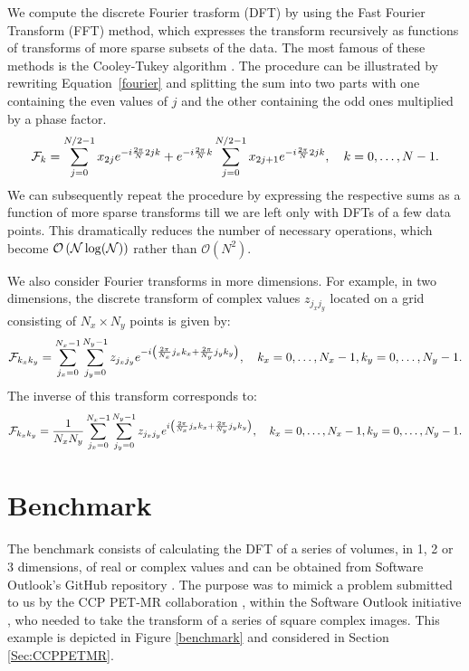 \documentclass[12pt, a4paper]{article} \setlength{\textheight}{24cm}
\begin{document}
We compute the discrete Fourier trasform (DFT) by using the Fast
Fourier Transform (FFT) method, which expresses the transform
recursively as functions of transforms of more sparse subsets of the
data. The most famous of these methods is the Cooley-Tukey algorithm
\cite{CT}. The procedure can be illustrated by rewriting
Equation~\ref{fourier} and splitting the sum into two parts with one
containing the even values of $j$ and the other containing the odd
ones multiplied by a phase factor.
\begin{equation}\label{ct} {\cal
    F}_k=\sum_{j=0}^{N/2-1}x_{2j}e^{-i\frac{2\pi}{N}2jk}+e^{-i\frac{2\pi}{N}k}\sum_{j=0}^{N/2-1}x_{2j+1}e^{-i\frac{2\pi}{N}2jk},
  \quad k=0,\ldots, N-1.
\end{equation}
We can subsequently repeat the procedure by expressing the respective
sums as a function of more sparse transforms till we are left only
with DFTs of a few data points. This dramatically reduces the number
of necessary operations, which become $\cal{O}\left(N\log(N)\right)$
rather than $\mathcal{O}\left(N^{2} \right)$.

We also consider Fourier transforms in more dimensions. For example,
in two dimensions, the discrete transform of complex values $z_{j_x
  j_y}$ located on a grid consisting of $N_x \times N_y$ points is
given by:
$$
{\cal F}_{k_x k_y}=\sum_{j_x=0}^{N_x-1} \sum_{j_y=0}^{N_y-1} z_{j_x
  j_y} e^{-i\left(\frac{2\pi}{N_x} j_x k_x+\frac{2\pi}{N_y} j_y
    k_y\right)}, \quad k_x=0,\ldots,N_x-1, k_y=0,\ldots,N_y-1.
$$
The inverse of this transform corresponds to:
$$
{\cal F}_{k_x k_y}=\frac{1}{N_xN_y}\sum_{j_x=0}^{N_x-1}
\sum_{j_y=0}^{N_y-1} z_{j_x j_y} e^{i\left(\frac{2\pi}{N_x} j_x
    k_x+\frac{2\pi}{N_y} j_y k_y\right)}, \quad k_x=0,\ldots,N_x-1,
k_y=0,\ldots,N_y-1.
$$
  
\section{Benchmark}\label{Sec:bench}

The benchmark consists of calculating the DFT of a series of volumes,
in 1, 2 or 3 dimensions, of real or complex values and can be obtained
from Software Outlook's GitHub repository \cite{code}. The purpose was
to mimick a problem submitted to us by the CCP PET-MR collaboration
\cite{bibccppetmr}, within the Software Outlook initiative
\cite{softwareoutlook}, who needed to take the transform of a series
of square complex images. This example is depicted in Figure
\ref{benchmark} and considered in Section \ref{Sec:CCPPETMR}.
\end{document}
